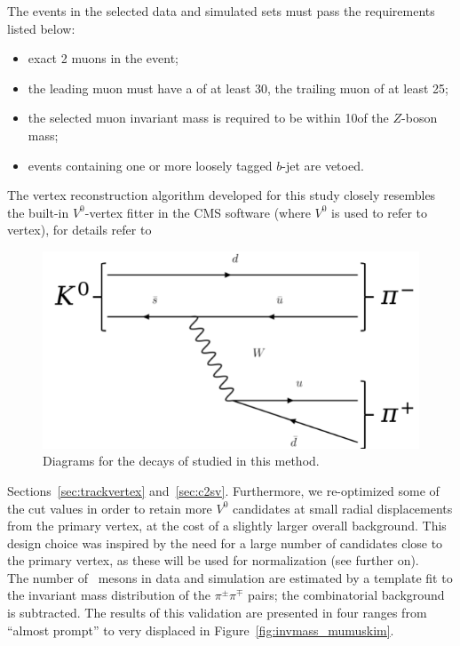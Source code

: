 \noindent The events in the selected data and simulated sets must pass the requirements listed below:
\begin{itemize}
\setlength\itemsep{-0.2em}
    \item exact 2 muons in the event;
    \item the leading muon must have a \pt of at least 30\GeV, the trailing muon of at least 25\GeV;
    \item the selected muon invariant mass is required to be within 10\GeV of the $Z$-boson mass;
    \item events containing one or more loosely tagged $b$-jet are vetoed.
\end{itemize}
The vertex reconstruction algorithm developed for this study closely
resembles the built-in $V^0$-vertex fitter in the CMS software (where
$V^0$ is used to refer to
 \PKzS vertex), for details refer to
\begin{figure}
   \includegraphics[width=0.8\linewidth]{Figures/c6/efficiencies/diagram_ks}
   \caption{Diagrams for the decays of \PKzS studied in this method.}
    \label{fig:svdiagrams}
\end{figure}
Sections~\ref{sec:trackvertex} and~\ref{sec:c2sv}.
Furthermore, we re-optimized some of the cut
values in order to retain more $V^0$ candidates at small radial
displacements from the primary vertex, at the cost of a slightly
larger overall background. This design choice was inspired by the need
for a large number of candidates close to the primary vertex, as these
will be used for normalization (see further on). \\
The number of \PKzS~mesons in data and simulation
are estimated by a template fit to the invariant mass distribution of the $\pi^{\pm}\pi^{\mp}$
pairs; the combinatorial background is subtracted. The results of this
validation are presented in four \Deltwod ranges
from ``almost prompt'' to very displaced in Figure~\ref{fig:invmass_mumuskim}.


